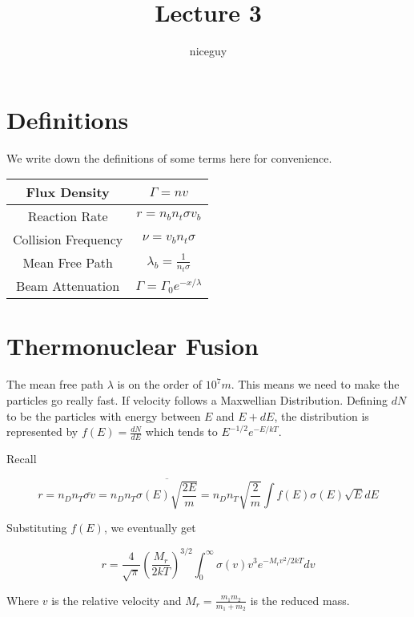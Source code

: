 \documentclass[12pt]{article}
\title{Lecture 3}
\author{niceguy}
\begin{document}
\maketitle

\section{Definitions}

We write down the definitions of some terms here for convenience.

\begin{table}[h]
    \begin{center}
    \begin{tabular}{|c||c|}
        \hline
        Flux Density & $\Gamma = nv$ \\
        \hline
        Reaction Rate & $r = n_bn_t\sigma v_b$ \\
        \hline
        Collision Frequency & $\nu = v_bn_t\sigma$ \\
        \hline
        Mean Free Path & $\lambda_b = \frac{1}{n_t\sigma}$ \\
        \hline
        Beam Attenuation & $\Gamma = \Gamma_0e^{-x/\lambda}$ \\
        \hline
    \end{tabular}
    \end{center}
\end{table}

\section{Thermonuclear Fusion}

The mean free path $\lambda$ is on the order of $10^7\unit{m}$. This means we need to make the particles go really fast. If velocity follows a Maxwellian Distribution. Defining $dN$ to be the particles with energy between $E$ and $E+dE$, the distribution is represented by $f(E) = \frac{dN}{dE}$ which tends to $E^{-1/2}e^{-E/kT}$.

Recall

$$r = n_Dn_T \overline{\sigma v} = n_Dn_T \overline{\sigma(E)\sqrt{\frac{2E}{m}}} = n_Dn_T \sqrt{\frac{2}{m}} \int f(E)\sigma(E)\sqrt{E}dE$$

Substituting $f(E)$, we eventually get

$$r = \frac{4}{\sqrt{\pi}} \left(\frac{M_r}{2kT}\right)^{3/2} \int_0^\infty \sigma(v)v^3e^{-M_rv^2/2kT}dv$$

Where $v$ is the relative velocity and $M_r = \frac{m_1m_2}{m_1+m_2}$ is the reduced mass.
\end{document}
